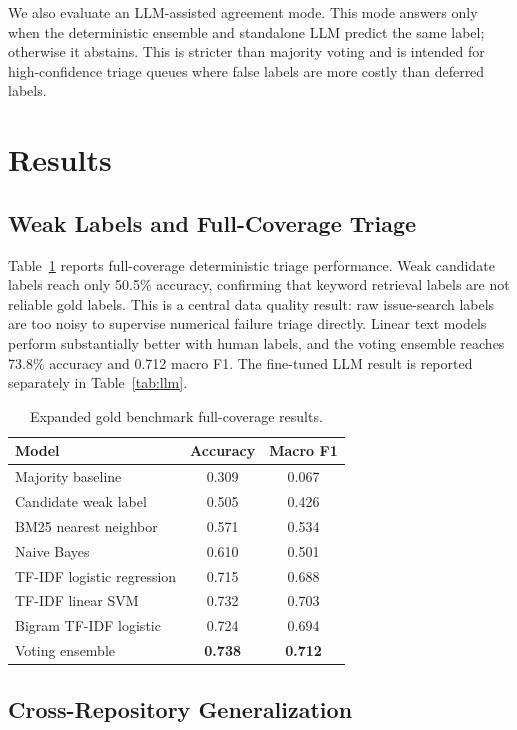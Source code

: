 \documentclass[conference]{IEEEtran}
\begin{document}
We also evaluate an LLM-assisted agreement mode. This mode answers only when
the deterministic ensemble and standalone LLM predict the same label; otherwise
it abstains. This is stricter than majority voting and is intended for
high-confidence triage queues where false labels are more costly than deferred
labels.

\section{Results}

\subsection{Weak Labels and Full-Coverage Triage}

Table~\ref{tab:fullcoverage} reports full-coverage deterministic triage
performance. Weak candidate labels reach only 50.5\% accuracy, confirming that
keyword retrieval labels are not reliable gold labels. This is a central data
quality result: raw issue-search labels are too noisy to supervise numerical
failure triage directly. Linear text models perform substantially better with
human labels, and the voting ensemble reaches 73.8\% accuracy and 0.712 macro
F1. The fine-tuned LLM result is reported separately in Table~\ref{tab:llm}.

\begin{table}[t]
\centering
\caption{Expanded gold benchmark full-coverage results.}
\label{tab:fullcoverage}
\begin{tabular}{lcc}
\toprule
Model & Accuracy & Macro F1 \\
\midrule
Majority baseline & 0.309 & 0.067 \\
Candidate weak label & 0.505 & 0.426 \\
BM25 nearest neighbor & 0.571 & 0.534 \\
Naive Bayes & 0.610 & 0.501 \\
TF-IDF logistic regression & 0.715 & 0.688 \\
TF-IDF linear SVM & 0.732 & 0.703 \\
Bigram TF-IDF logistic & 0.724 & 0.694 \\
Voting ensemble & \textbf{0.738} & \textbf{0.712} \\
\bottomrule
\end{tabular}
\end{table}

\subsection{Cross-Repository Generalization}
\end{document}
